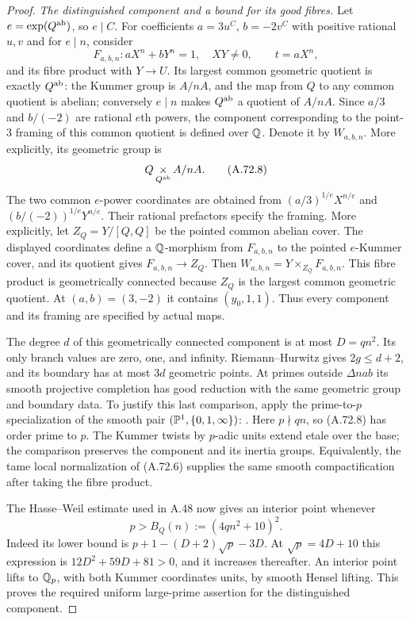 \begin{proof}
\emph{The distinguished component and a bound for its good fibres.}
Let $e=\exp(Q^{\rm ab})$, so $e\mid C$.
For coefficients $a=3u^C$, $b=-2v^C$ with positive rational $u,v$
and for $e\mid n$, consider
\[
 F_{a,b,n}:aX^n+bY^n=1,\quad XY\ne0,
       \qquad t=aX^n,
\tag{A.72.7}
\]
and its fibre product with $Y\to U$.
Its largest common geometric quotient is exactly $Q^{\rm ab}$:
the Kummer group is $A/nA$, and the map from $Q$ to any common
quotient is abelian; conversely $e\mid n$ makes $Q^{\rm ab}$ a
quotient of $A/nA$.
Since $a/3$ and $b/(-2)$ are rational $e$th powers, the component
corresponding to the point-$3$ framing of this common quotient is
defined over $\mathbb Q$.  Denote it by $W_{a,b,n}$.
More explicitly, its geometric group is
\[
                 Q\mathop{\times}_{Q^{\rm ab}}A/nA.
\tag{A.72.8}
\]
The two common $e$-power coordinates are obtained from
$(a/3)^{1/e}X^{n/e}$ and $(b/(-2))^{1/e}Y^{n/e}$.
Their rational prefactors specify the framing.  More explicitly, let
$Z_Q=Y/[Q,Q]$ be the pointed common abelian cover.  The displayed
coordinates define a $\mathbb Q$-morphism from $F_{a,b,n}$ to the pointed
$e$-Kummer cover, and its quotient gives $F_{a,b,n}\to Z_Q$.  Then
$W_{a,b,n}=Y\times_{Z_Q}F_{a,b,n}$.  This fibre product is
geometrically connected because $Z_Q$ is the largest common geometric
quotient.  At $(a,b)=(3,-2)$ it contains $(y_0,1,1)$.
Thus every component and its framing are specified by actual maps.

The degree $d$ of this geometrically connected component is at most
$D=qn^2$.  Its only branch values are zero, one, and infinity.
Riemann--Hurwitz gives $2g\le d+2$, and its boundary has at most
$3d$ geometric points.  At primes outside $\Delta nab$ its smooth
projective completion has good reduction with the same geometric
group and boundary data.  To justify this last comparison, apply
the prime-to-$p$ specialization of the smooth pair
$(\mathbb P^1,\{0,1,\infty\})$:
\cite[Expos\'e XIII, Corollary 2.9 and \S2.10; proof of
Corollary 2.12, pp.~289--291 in the re-typeset edition]{AgentSGA1}.
Here $p\nmid qn$, so (A.72.8) has order prime to $p$.
The Kummer twists by $p$-adic units extend etale over the base;
the comparison preserves the component and its inertia groups.
Equivalently, the tame local normalization of (A.72.6) supplies
the same smooth compactification after taking the fibre product.

The Hasse--Weil estimate used in A.48 now gives an interior point
whenever
\[
 p>B_Q(n):=(4qn^2+10)^2.
\tag{A.72.9}
\]
Indeed its lower bound is
$p+1-(D+2)\sqrt p-3D$.
At $\sqrt p=4D+10$ this expression is
$12D^2+59D+81>0$, and it increases thereafter.
An interior point lifts to $\mathbb Q_p$, with both Kummer coordinates
units, by smooth Hensel lifting.  This proves the required uniform
large-prime assertion for the distinguished component.


\end{proof}
